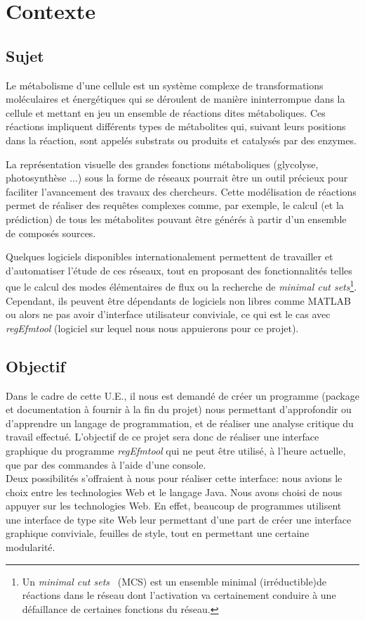 \section{Contexte}

\subsection{Sujet}
Le métabolisme d'une cellule est un système complexe de transformations moléculaires et énergétiques qui se déroulent de manière ininterrompue dans la cellule et mettant en jeu un ensemble de réactions dites métaboliques. 
Ces réactions impliquent différents types de métabolites qui, suivant leurs positions dans la réaction, sont appelés substrats ou produits et catalysés par des enzymes.

La représentation visuelle des grandes fonctions métaboliques (glycolyse, photosynthèse ...) sous la forme de réseaux pourrait être un outil précieux pour faciliter l'avancement des travaux des chercheurs. Cette modélisation de réactions permet de réaliser des requêtes complexes comme, par exemple, le calcul (et la prédiction) de tous les métabolites pouvant être générés à partir d'un ensemble de composés sources.

Quelques logiciels disponibles internationalement permettent de travailler et d'automatiser l'étude de ces réseaux, tout en proposant des fonctionnalités telles que le calcul des modes élémentaires de flux ou la recherche de \textit{minimal cut sets}\footnote{Un \textit{minimal cut sets}~\cite{mcs:url} (MCS) est un ensemble minimal (irréductible)de réactions dans le réseau dont l'activation va certainement conduire à une défaillance de certaines fonctions du réseau.}.  Cependant, ils peuvent être dépendants de logiciels non libres comme MATLAB ou alors ne pas avoir d'interface utilisateur conviviale, ce qui est le cas avec  \emph{regEfmtool} (logiciel sur lequel nous nous appuierons pour ce projet).

\subsection{Objectif}
Dans le cadre de cette U.E., il nous est demandé de créer un programme (package et documentation à fournir à la fin du projet) nous permettant d'approfondir ou d'apprendre un langage de programmation, et de réaliser une analyse critique du travail effectué. L'objectif de ce projet sera donc de réaliser une interface graphique du programme  \emph{regEfmtool} qui ne peut être utilisé, à l'heure actuelle, que par des commandes à l'aide d'une console. \\

Deux possibilités s'offraient à nous pour réaliser cette interface: nous avions le choix entre les technologies Web et le langage Java. Nous avons choisi de nous appuyer sur les technologies Web. En effet, beaucoup de programmes utilisent une interface de type site Web leur permettant d'une part de créer une interface graphique conviviale, feuilles de style, tout en permettant une certaine modularité. 